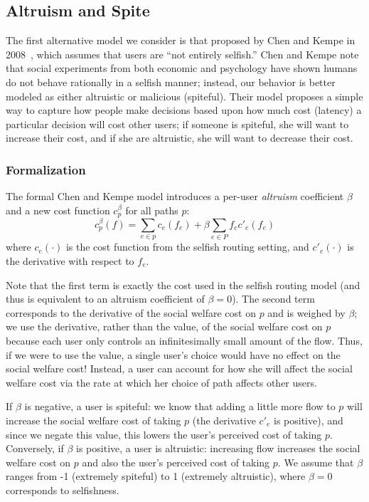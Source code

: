 \subsection{Altruism and Spite}
The first alternative model we consider is that proposed by Chen and Kempe in 2008~\cite{chen}, which assumes that users are ``not entirely selfish.''
Chen and Kempe note that social experiments from both economic and psychology have shown humans do not behave rationally in a selfish manner; instead, our behavior is better modeled as either altruistic or malicious (spiteful).
Their model proposes a simple way to capture how people make decisions based upon how much cost (latency) a particular decision will cost other users; if someone is spiteful, she will want to increase their cost, and if she are altruistic, she will want to decrease their cost.

\subsubsection{Formalization}
The formal Chen and Kempe model introduces a per-user \emph{altruism} coefficient $\beta$ and a new cost function
$c^\beta_p$ for all paths $p$: 
$$c^\beta_p(f) = \sum_{e \in p} c_e(f_e) + \beta\sum_{e\in P} f_ec'_e(f_e)$$
where $c_e(\cdot)$ is the cost function from the selfish routing setting, and $c'_e(\cdot)$ is the derivative with respect to $f_e$.

Note that the first term is exactly the cost used in the selfish routing model (and thus is equivalent to an altruism coefficient of $\beta = 0$).
The second term corresponds to the derivative of the social welfare cost on $p$ and is weighed by $\beta$; we use the derivative, rather than the value, of the social welfare cost on $p$ because each user only controls an infinitesimally small amount of the flow. Thus, if we were to use the value, 
a single user's choice would have no effect on the social welfare cost! 
Instead, a user can account for how she will affect the social welfare cost via the rate at which her  choice of path affects other users.

If $\beta$ is negative, a user is spiteful: we know that adding a little more flow to $p$ will increase the social welfare cost of taking $p$ (the derivative $c'_e$ is positive), and since we negate this value, this lowers the user's perceived cost of taking $p$.
Conversely, if $\beta$ is positive, a user is altruistic: increasing flow increases the social welfare cost on $p$ and also the user's perceived cost of taking $p$.
We assume that $\beta$ ranges from -1 (extremely spiteful) to 1 (extremely altruistic), where $\beta=0$ corresponds to selfishness.


